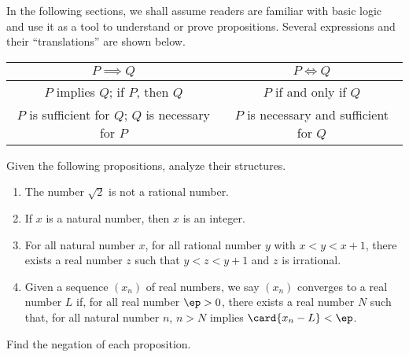 \documentclass[10pt]{article}
\begin{document}
\par
In the following sections, we shall assume readers are familiar with basic logic and use it as a tool to understand or prove propositions. Several expressions and their “translations” are shown below.
\begin{center}
    \begin{tabular}{c|c}
        $P\implies Q$ & $P\iff Q$ \\
        \hline
        $P$ implies $Q$; if $P$, then $Q$ & $P$ if and only if $Q$ \\
        $P$ is sufficient for $Q$; $Q$ is necessary for $P$ & $P$ is necessary and sufficient for $Q$
    \end{tabular}
\end{center}
\begin{problem}
    Given the following propositions, analyze their structures.
    \begin{enumerate}
        \item The number $\sqrt{2}$ is not a rational number.
        \item If $x$ is a natural number, then $x$ is an integer.
        \item For all natural number $x$, for all rational number $y$ with $x<y<x+1$, there exists a real number $z$ such that $y<z<y+1$ and $z$ is irrational.
        \item Given a sequence $({x}_{n})$ of real numbers, we say $({x}_{n})$ converges to a real number $L$ if, for all real number $\ep>0$, there exists a real number $N$ such that, for all natural number $n$, $n>N$ implies $\card{{x}_{n}-L}<\ep$.
    \end{enumerate} 
    Find the negation of each proposition. 
\end{problem}
\end{document}
